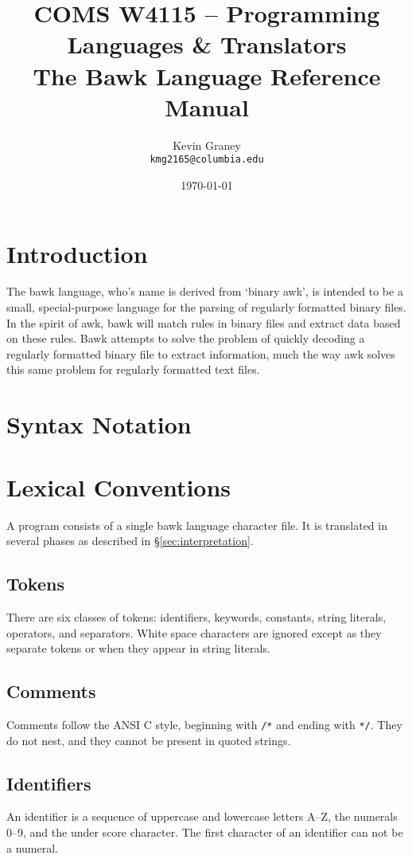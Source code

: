 \documentclass[letterpaper]{article}
\title{
	{\large COMS W4115 -- Programming Languages \& Translators}\\
	The Bawk Language Reference Manual}
\author{Kevin Graney\\
	\texttt{kmg2165@columbia.edu}}
\date{\today}
\begin{document}
\maketitle
\tableofcontents

\section{Introduction}
The bawk language, who's name is derived from `binary awk', is intended to be a small, special-purpose language for the parsing of regularly formatted binary files.  In the spirit of awk, bawk will match rules in binary files and extract data based on these rules.  Bawk attempts to solve the problem of quickly decoding a regularly formatted binary file to extract information, much the way awk solves this same problem for regularly formatted text files.

\section{Syntax Notation}


\section{Lexical Conventions}
A program consists of a single bawk language character file.  It is translated in several phases as described in \S\ref{sec:interpretation}.

\subsection{Tokens}
There are six classes of tokens: identifiers, keywords, constants, string literals, operators, and separators.  White space characters are ignored except as they separate tokens or when they appear in string literals.

\subsection{Comments}
Comments follow the ANSI C style, beginning with \texttt{/*} and ending with \texttt{*/}.  They do not nest, and they cannot be present in quoted strings.

\subsection{Identifiers}
An identifier is a sequence of uppercase and lowercase letters A--Z, the numerals 0--9, and the under score character.  The first character of an identifier can not be a numeral.
\end{document}

